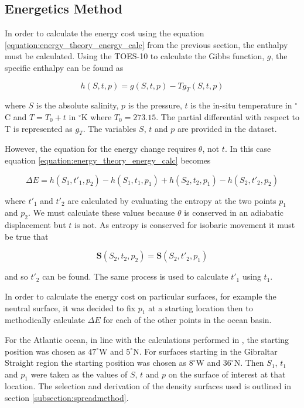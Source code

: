 \subsection{Energetics Method}
\label{subsection:energeticsmethod}

In order to calculate the energy cost using the equation \ref{equation:energy_theory_energy_calc} from the previous section, the enthalpy must be calculated. Using the TOES-10 to calculate the Gibbs function, $g$, the specific enthalpy can be found as

\begin{equation}
    h(S,t,p) = g(S,t,p) - Tg_T(S,t,p)
\end{equation}

where $S$ is the absolute salinity, $p$ is the pressure, $t$ is the in-situ temperature in $^{\circ}$C and $T = T_0 + t$ in $^{\circ}$K where $T_0 = 273.15$. The partial differential with respect to T is represented as $g_T$. The variables $S$, $t$ and $p$ are provided in the \citet{WOCE2002} dataset. 

However, the equation for the energy change requires $\theta$, not $t$. In this case equation \ref{equation:energy_theory_energy_calc} becomes

\begin{equation}
    \Delta E = h(S_1, t'_1, p_2) - h(S_1, t_1, p_1) +h(S_2, t_2, p_1) - h(S_2, t'_2, p_2)
    \label{equation:energy_method_energy_calc}
\end{equation}

where $t'_1$ and $t'_2$ are calculated by evaluating the entropy at the two points $p_1$ and $p_2$. We must calculate these values because $\theta$ is conserved in an adiabatic displacement but $t$ is not. As entropy is conserved for isobaric movement it must be true that

\begin{equation}
    \mathbf{S}(S_2, t_2, p_2) = \mathbf{S}(S_2, t'_2, p_1)
\end{equation}

and so $t'_2$ can be found. The same process is used to calculate $t'_1$ using $t_1$. 

In order to calculate the energy cost on particular surfaces, for example the neutral surface, it was decided to fix $p_1$ at a starting location then to methodically calculate $\Delta E$ for each of the other points in the ocean basin. 

For the Atlantic ocean, in line with the calculations performed in \citet{McDougall1987}, the starting position was chosen as $47^{\circ}$W and $5^{\circ}$N. For surfaces starting in the Gibraltar Straight region the starting position was chosen as $8^{\circ}$W and $36^{\circ}$N. Then $S_1$, $t_1$ and $p_1$ were taken as the values of $S$, $t$ and $p$ on the surface of interest at that location. The selection and derivation of the density surfaces used is outlined in section \ref{subsection:spreadmethod}. 

